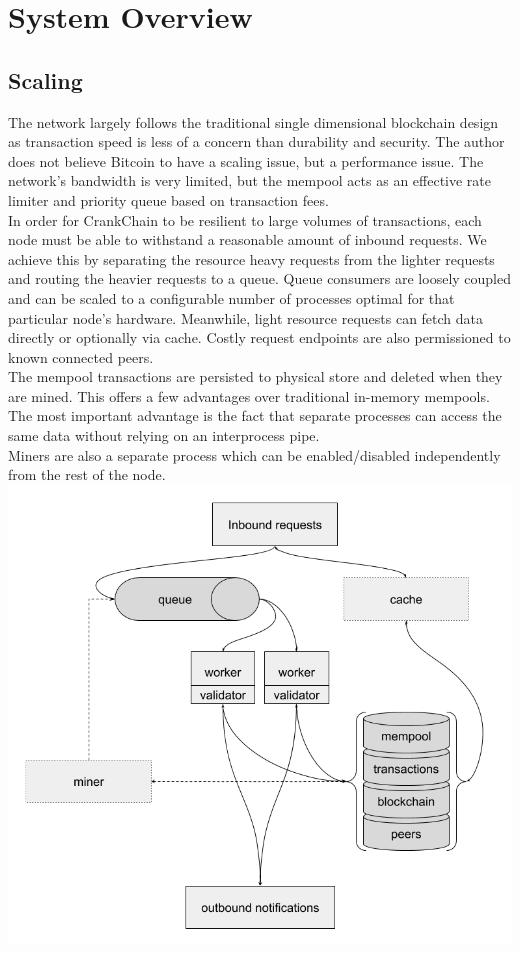 \documentclass[10pt,twocolumn]{article}
\begin{document}
\section{System Overview}
\subsection{Scaling}
The network largely follows the traditional single dimensional blockchain design as transaction speed is less of a concern than durability and security.  The author does not believe Bitcoin to have a scaling issue, but a performance issue.  The network's bandwidth is very limited, but the mempool acts as an effective rate limiter and priority queue based on transaction fees.\\
In order for CrankChain to be resilient to large volumes of transactions, each node must be able to withstand a reasonable amount of inbound requests.  We achieve this by separating the resource heavy requests from the lighter requests and routing the heavier requests to a queue.  Queue consumers are loosely coupled and can be scaled to a configurable number of processes optimal for that particular node's hardware.  Meanwhile, light resource requests can fetch data directly or optionally via cache.  Costly request endpoints are also permissioned to known connected peers.\\
The mempool transactions are persisted to physical store and deleted when they are mined.  This offers a few advantages over traditional in-memory mempools.  The most important advantage is the fact that separate processes can access the same data without relying on an interprocess pipe.\\
Miners are also a separate process which can be enabled/disabled independently from the rest of the node.
\includegraphics[width=1.00\linewidth]{node_design.png}
\end{document}
